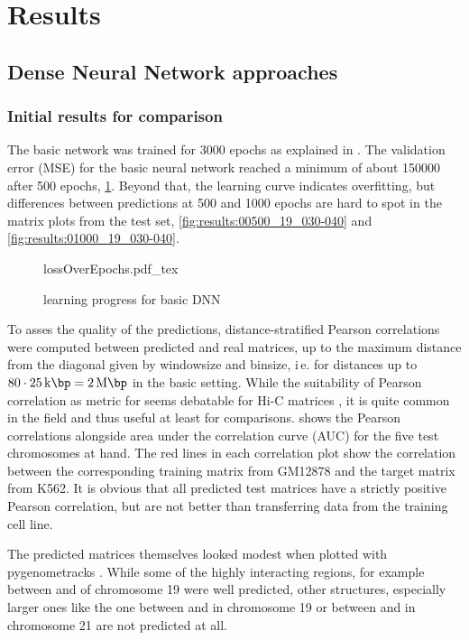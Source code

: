 \section{Results}
\subsection{Dense Neural Network approaches} 

\subsubsection{Initial results for comparison} \label{sec:initialDNNresults}
The basic network was trained for 3000 epochs as explained in \xxx.
The validation error (MSE) for the basic neural network reached a minimum of about \SI{150000}{} after 500 epochs, \cref{fig:results:basicDNN_lossEpochs}.
Beyond that, the learning curve indicates overfitting, but differences between predictions at 500 and 1000 epochs are hard to spot in the matrix plots from the test set, 
\cref{fig:results:00500_19_030-040} and \ref{fig:results:01000_19_030-040}.
\begin{figure}[hbp]
 \centering
 \scriptsize
 {lossOverEpochs.pdf_tex}
 \caption{learning progress for basic DNN} \label{fig:results:basicDNN_lossEpochs}
\end{figure}
To asses the quality of the predictions, distance-stratified Pearson correlations were computed between predicted and real matrices,
up to the maximum distance from the diagonal given by windowsize and binsize, i\,e. for distances up to $80\cdot \SI{25}{\kilo\bp}=\SI{2}{\mega\bp}$ in the basic setting.
While the suitability of Pearson correlation as metric for seems debatable for Hi-C matrices \xxx, it is quite common in the field and thus useful at least for comparisons.
 shows the Pearson correlations alongside area under the correlation curve (AUC) for the five test chromosomes at hand.
The red lines in each correlation plot show the correlation between the corresponding training matrix from GM12878 and the target matrix from K562.
It is obvious that all predicted test matrices have a strictly positive Pearson correlation, but are not better than transferring data from the training cell line.

The predicted matrices themselves looked modest when plotted with pygenometracks \xxx. 
While some of the highly interacting regions, for example between \xxx and \xxx of chromosome 19 were
well predicted, other structures, especially larger ones like the one between \xxx and \xxx in chromosome 19 
or between \xxx and \xxx in chromosome 21 are not predicted at all.

